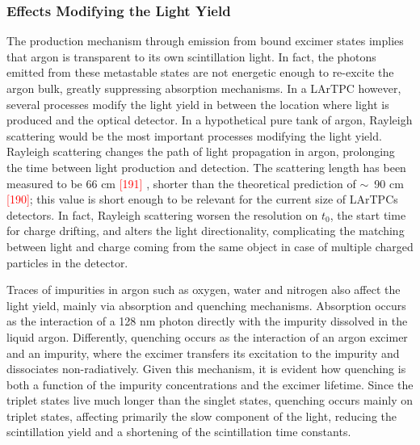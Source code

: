 \subsubsection{Effects Modifying the  Light Yield}
The production mechanism through emission from bound excimer states implies that argon is  transparent to its own scintillation light. In fact, the photons emitted from these metastable states are not energetic enough to re-excite the argon bulk, greatly suppressing absorption mechanisms. In a LArTPC however, several processes modify the light yield in between the location where light is produced and the optical detector. In a hypothetical pure tank of argon, Rayleigh scattering would be the most important processes modifying the light yield. Rayleigh scattering changes the path of light propagation in argon, prolonging the time between light production and detection.  The scattering length has been measured to be 66 cm \textcolor{red}{[191]} , shorter than the theoretical prediction of $\sim$~90 cm \textcolor{red}{[190]}; this value is short enough to be relevant for the current size of LArTPCs detectors. In fact, Rayleigh scattering worsen the resolution on $t_0$, the start time for charge drifting, and  alters the light directionality, complicating the matching between light and charge coming from the same object in case of multiple charged particles in the detector. 

Traces of impurities in argon such as oxygen, water and nitrogen  also affect the light yield, mainly  via absorption and quenching mechanisms. 
Absorption occurs as the interaction of a 128 nm photon directly with the impurity dissolved in the liquid argon.  Differently, quenching occurs as the interaction of an argon excimer and an impurity, where the excimer transfers its excitation to the impurity and  dissociates non-radiatively.  Given this mechanism, it is evident how quenching is both a function of the impurity concentrations and the excimer lifetime.  Since the triplet states live much longer than the singlet states,  quenching occurs mainly on triplet states, affecting primarily the slow component of the light,  reducing the scintillation yield and a shortening of the scintillation time constants.  

